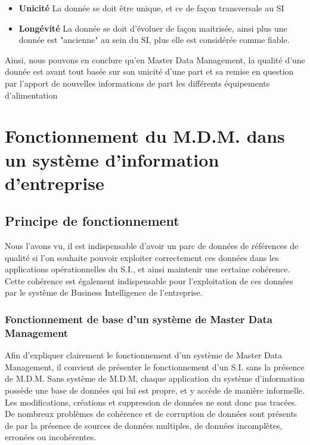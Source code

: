 \begin{itemize}
\item  \textbf{Unicité} La donnée se doit être unique, et ce de façon transversale au SI
\item \textbf{Longévité} La donnée se doit d'évoluer de façon maitrisée, ainsi plus une donnée est "ancienne" au sein du SI, plus elle est considérée comme fiable.
\end{itemize}

Ainsi, nous pouvons en conclure qu'en Master Data Management, la qualité d'une donnée est avant tout basée sur son unicité d'une part et sa remise en question par l'apport de nouvelles informations de part les différents équipements d'alimentation\\

\section{Fonctionnement du M.D.M. dans un système d'information d'entreprise}

\subsection{Principe de fonctionnement}

Nous l'avons vu, il est indispensable d'avoir un parc de données de références de qualité si l'on souhaite pouvoir exploiter correctement ces données dans les applications opérationnelles du S.I., et ainsi maintenir une certaine cohérence. Cette cohérence est également indispensable pour l'exploitation de ces données par le système de Business Intelligence de l'entreprise.\\

\subsubsection{Fonctionnement de base d'un système de Master Data Management}

Afin d'expliquer clairement le fonctionnement d'un système de Master Data Management, il convient de présenter le fonctionnement d'un S.I. sans la présence de M.D.M.
Sans système de M.D.M, chaque application du système d'information possède une base de données qui lui est propre, et y accède de manière informelle.
Les modifications, créations et suppression de données ne sont donc pas tracées. De nombreux problèmes de cohérence et de corruption de données sont présents de par la présence de sources de données multiples, de données incomplètes, erronées ou incohérentes.\\\\

